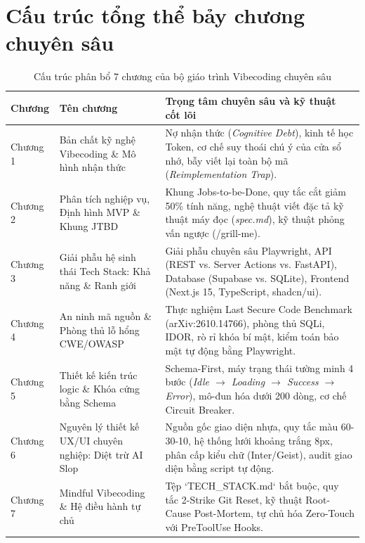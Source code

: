 \documentclass[a4paper,11pt]{article}
\begin{document}
\section{Cấu trúc tổng thể bảy chương chuyên sâu}

\begin{table}[htbp]
\centering
\small
\caption{Cấu trúc phân bổ 7 chương của bộ giáo trình Vibecoding chuyên sâu}
\vspace{0.5em}
\begin{tabularx}{\textwidth}{L{2.0cm} L{4.5cm} Y}
\toprule
\textbf{Chương} & \textbf{Tên chương} & \textbf{Trọng tâm chuyên sâu và kỹ thuật cốt lõi} \\
\midrule
Chương 1 & Bản chất kỹ nghệ Vibecoding \& Mô hình nhận thức & Nợ nhận thức (\textit{Cognitive Debt}), kinh tế học Token, cơ chế suy thoái chú ý của cửa sổ nhớ, bẫy viết lại toàn bộ mã (\textit{Reimplementation Trap}). \\
Chương 2 & Phân tích nghiệp vụ, Định hình MVP \& Khung JTBD & Khung Jobs-to-be-Done, quy tắc cắt giảm 50\% tính năng, nghệ thuật viết đặc tả kỹ thuật máy đọc (\textit{spec.md}), kỹ thuật phỏng vấn ngược (/grill-me). \\
Chương 3 & Giải phẫu hệ sinh thái Tech Stack: Khả năng \& Ranh giới & Giải phẫu chuyên sâu Playwright, API (REST vs. Server Actions vs. FastAPI), Database (Supabase vs. SQLite), Frontend (Next.js 15, TypeScript, shadcn/ui). \\
Chương 4 & An ninh mã nguồn \& Phòng thủ lỗ hổng CWE/OWASP & Thực nghiệm Last Secure Code Benchmark (arXiv:2610.14766), phòng thủ SQLi, IDOR, rò rỉ khóa bí mật, kiểm toán bảo mật tự động bằng Playwright. \\
Chương 5 & Thiết kế kiến trúc logic \& Khóa cứng bằng Schema & Schema-First, máy trạng thái tường minh 4 bước (\textit{Idle $\to$ Loading $\to$ Success $\to$ Error}), mô-đun hóa dưới 200 dòng, cơ chế Circuit Breaker. \\
Chương 6 & Nguyên lý thiết kế UX/UI chuyên nghiệp: Diệt trừ AI Slop & Nguồn gốc giao diện nhựa, quy tắc màu 60-30-10, hệ thống lưới khoảng trắng 8px, phân cấp kiểu chữ (Inter/Geist), audit giao diện bằng script tự động. \\
Chương 7 & Mindful Vibecoding \& Hệ điều hành tự chủ & Tệp `TECH\_STACK.md` bắt buộc, quy tắc 2-Strike Git Reset, kỹ thuật Root-Cause Post-Mortem, tự chủ hóa Zero-Touch với PreToolUse Hooks. \\
\bottomrule
\end{tabularx}
\end{table}
\end{document}
